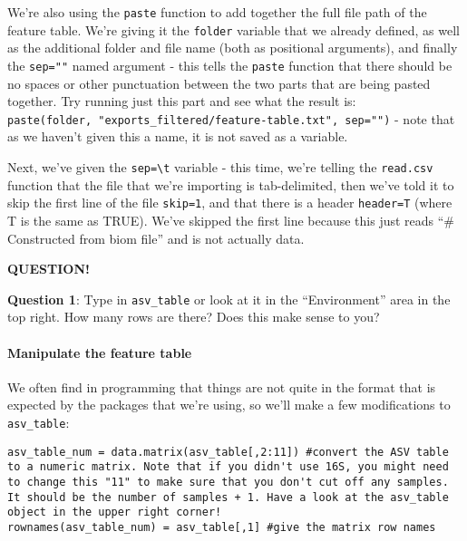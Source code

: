 \documentclass[
]{book}
\newenvironment{bluebox}{
  \definecolor{shadecolor}{RGB}{172, 210, 237}
  \color{white}
  \begin{shaded}}
 {\end{shaded}}
\begin{document}
We're also using the \texttt{paste} function to add together the full file path of the feature table. We're giving it the \texttt{folder} variable that we already defined, as well as the additional folder and file name (both as positional arguments), and finally the \texttt{sep=""} named argument - this tells the \texttt{paste} function that there should be no spaces or other punctuation between the two parts that are being pasted together. Try running just this part and see what the result is: \texttt{paste(folder,\ "exports\_filtered/feature-table.txt",\ sep="")} - note that as we haven't given this a name, it is not saved as a variable.

Next, we've given the \texttt{sep=\textquotesingle{}\textbackslash{}t\textquotesingle{}} variable - this time, we're telling the \texttt{read.csv} function that the file that we're importing is tab-delimited, then we've told it to skip the first line of the file \texttt{skip=1}, and that there is a header \texttt{header=T} (where T is the same as TRUE). We've skipped the first line because this just reads ``\# Constructed from biom file'' and is not actually data.

\begin{bluebox}

\begin{center}
\textbf{QUESTION!}

\end{center}

\textbf{Question 1}: Type in \texttt{asv\_table} or look at it in the ``Environment'' area in the top right. How many rows are there? Does this make sense to you?

\end{bluebox}

\paragraph{Manipulate the feature table}\label{manipulate-the-feature-table}

We often find in programming that things are not quite in the format that is expected by the packages that we're using, so we'll make a few modifications to \texttt{asv\_table}:

\begin{verbatim}
asv_table_num = data.matrix(asv_table[,2:11]) #convert the ASV table to a numeric matrix. Note that if you didn't use 16S, you might need to change this "11" to make sure that you don't cut off any samples. It should be the number of samples + 1. Have a look at the asv_table object in the upper right corner!
rownames(asv_table_num) = asv_table[,1] #give the matrix row names
\end{verbatim}
\end{document}
